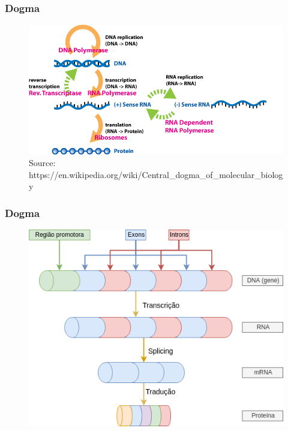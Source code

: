 \documentclass{beamer}
\begin{document}
		\begin{frame}\frametitle{Dogma}
		\begin{figure}[hbtp]
			\centering
			\includegraphics[scale=0.35]{img/dogma.jpg}
			\caption{\tiny{Source: https://en.wikipedia.org/wiki/Central\_dogma\_of\_molecular\_biology}}
		\end{figure}
		\end{frame}

		\begin{frame} \frametitle{Dogma}
		\begin{figure}[hbtp]
			\centering
			\includegraphics[scale=0.5]{img/dogma_tt.png}
		\end{figure}
		\end{frame}
		
\end{document}
